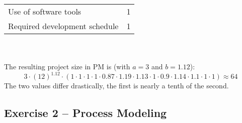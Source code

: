 \documentclass{scrartcl}
\begin{document}
\begin{itemize}
\begin{tabular}{l | c}
		Use of software tools & 1\\
		Required development schedule & 1\\
	\end{tabular}\\\\
	The resulting project size in PM is (with $a=3$ and $b=1.12$):
	\[3 \cdot (12)^{1.12}\cdot (1\cdot 1 \cdot 1 \cdot 1 \cdot 0.87 \cdot 1.19 \cdot 1.13 \cdot 1 \cdot 0.9 \cdot 1.14 \cdot 1.1 \cdot 1 \cdot 1) \approx 64\]
	The two values differ drastically, the first is nearly a tenth of the second. 
\end{itemize}

\subsection*{Exercise 2 – Process Modeling}
\end{document}
